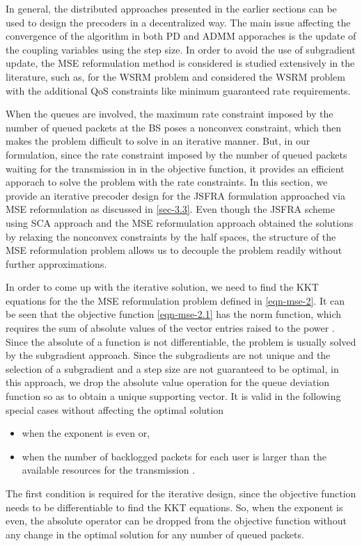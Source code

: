 
In general, the distributed approaches presented in the earlier sections can be used to design the precoders in a decentralized way. The main issue affecting the convergence of the algorithm in both \acl{PD} and \ac{ADMM} apporaches is the update of the coupling variables using the step size. In order to avoid the use of subgradient update, the \ac{MSE} reformulation method is considered is studied extensively in the literature, such as, \cite{wmmse_shi} for the \ac{WSRM} problem and \cite{kaleva2012weighted} considered the \ac{WSRM} problem with the additional \ac{QoS} constraints like minimum guaranteed rate requirements.

When the queues are involved, the maximum rate constraint imposed by the number of queued packets at the \ac{BS} poses a nonconvex constraint, which then makes the problem difficult to solve in an iterative manner. But, in our formulation, since the rate constraint imposed by the number of queued packets waiting for the transmission in in the objective function, it provides an efficient apporach to solve the problem with the rate constraints. In this section, we provide an iterative precoder design for the \ac{JSFRA} formulation approached via \ac{MSE} reformulation as discussed in \ref{sec-3.3}. Even though the \ac{JSFRA} scheme using \ac{SCA} approach and the \ac{MSE} reformulation approach obtained the solutions by relaxing the nonconvex constraints by the half spaces, the structure of the \ac{MSE} reformulation problem allows us to decouple the problem readily without further approximations.

In order to come up with the iterative solution, we need to find the \ac{KKT} equations for the the \ac{MSE} reformulation problem defined in \eqref{eqn-mse-2}. It can be seen that the objective function \eqref{eqn-mse-2.1} has the norm function, which requires the sum of absolute values of the vector entries raised to the power . Since the absolute of a function is not differentiable, the problem is usually solved by the subgradient approach. Since the subgradients are not unique and the selection of a subgradient and a step size are not guaranteed to be optimal, in this approach, we drop the absolute value operation for the queue deviation function so as to obtain a unique supporting vector. It is valid in the following special cases without affecting the optimal solution
\begin{itemize}
\item when the exponent  is even or,
\item when the number of backlogged packets for each user is larger than the available resources for the transmission .
\end{itemize}
The first condition is required for the iterative design, since the objective function needs to be differentiable to find the \ac{KKT} equations. So, when the exponent  is even, the absolute operator can be dropped from the objective function without any change in the optimal solution for any number of queued packets.

